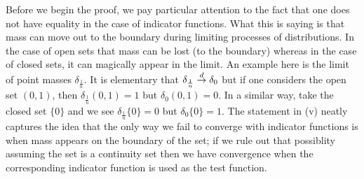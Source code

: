 Before we begin the proof, we pay particular attention to the fact that one does not have
equality in the case of indicator functions.  What this
is saying is that mass can move out to the boundary during limiting
processes of distributions.  In the case of open sets that mass can be lost (to the
boundary) whereas in the case of closed sets, it can magically appear
in the limit.  An example here is the limit of point masses
$\delta_{\frac{1}{n}}$.  It is elementary that $\delta_{\frac{1}{n}} \overset{d}\to
\delta_0$ but if one considers the open set $(0,1)$, then
$\delta_{\frac{1}{n}}(0,1) = 1$ but $\delta_0(0,1) = 0$.  In a similar
way, take the closed set $\lbrace 0 \rbrace$ and we see $\delta_{\frac{1}{n}} \lbrace 0 \rbrace = 0$ but $\delta_0
\lbrace 0 \rbrace = 1$.  The statement in (v) neatly captures the idea
that the only way we fail to converge with indicator functions is when
mass appears on the boundary of the set; if we rule out that
possiblity assuming the set is a continuity set then we have
convergence when the corresponding indicator function is used as the
test function.

